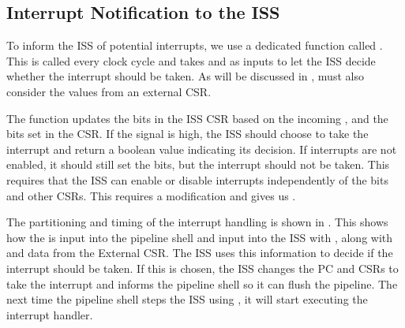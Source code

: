 \subsection{Interrupt Notification to the ISS}
\label{sec:ps_interrupt_to_iss}

To inform the ISS of potential interrupts, we use a dedicated function called . This is called every clock cycle and takes  and  as inputs to let the ISS decide whether the interrupt should be taken. As will be discussed in ,  must also consider the values from an external CSR.

The  function updates the  bits in the ISS CSR based on the incoming , and the bits set in the  CSR. If the  signal is high, the ISS should choose to take the interrupt and return a boolean value indicating its decision. If interrupts are not enabled, it should still set the  bits, but the interrupt should not be taken. This requires that the ISS can enable or disable interrupts independently of the  bits and other CSRs. This requires a modification and gives us . 

The partitioning and timing of the interrupt handling is shown in . This shows how the  is input into the pipeline shell and input into the ISS with , along with  and data from the External CSR. The ISS uses this information to decide if the interrupt should be taken. If this is chosen, the ISS changes the PC and CSRs to take the interrupt and informs the pipeline shell so it can flush the pipeline. The next time the pipeline shell steps the ISS using , it will start executing the interrupt handler.

